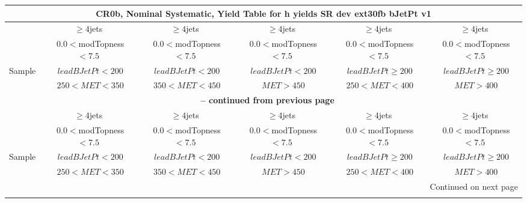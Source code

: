 \documentclass{article}
\begin{document}
\begin{longtable}{|l|c|c|c|c|c|} 
 
\multicolumn{6}{c}{ CR0b, Nominal Systematic, Yield Table for h yields SR dev ext30fb bJetPt v1 }\\* \hline 
  & $\ge4$jets  & $\ge4$jets  & $\ge4$jets  & $\ge4$jets  & $\ge4$jets \\* 
  & ~$0.0<$modTopness$<7.5$  & ~$0.0<$modTopness$<7.5$  & ~$0.0<$modTopness$<7.5$  & ~$0.0<$modTopness$<7.5$  & ~$0.0<$modTopness$<7.5$ \\* 
Sample  & ~$leadBJetPt<200$  & ~$leadBJetPt<200$  & ~$leadBJetPt<200$  & ~$leadBJetPt\ge200$  & ~$leadBJetPt\ge200$ \\* 
  & ~$250<MET<350$  & ~$350<MET<450$  & ~$MET>450$  & ~$250<MET<400$  & ~$MET>400$ \\* 
\hline \hline 
\endfirsthead 
 
\multicolumn{6}{c}{{\bfseries \tablename\ \thetable{} -- continued from previous page}}\\* \hline 
  & $\ge4$jets  & $\ge4$jets  & $\ge4$jets  & $\ge4$jets  & $\ge4$jets \\* 
  & ~$0.0<$modTopness$<7.5$  & ~$0.0<$modTopness$<7.5$  & ~$0.0<$modTopness$<7.5$  & ~$0.0<$modTopness$<7.5$  & ~$0.0<$modTopness$<7.5$ \\* 
Sample  & ~$leadBJetPt<200$  & ~$leadBJetPt<200$  & ~$leadBJetPt<200$  & ~$leadBJetPt\ge200$  & ~$leadBJetPt\ge200$ \\* 
  & ~$250<MET<350$  & ~$350<MET<450$  & ~$MET>450$  & ~$250<MET<400$  & ~$MET>400$ \\* 
\hline \hline 
\endhead 
 
\multicolumn{6}{|r|}{{Continued on next page}}\\* \hline 
\endfoot 
 
 
\endlastfoot 
 

\end{longtable}
\end{document}
